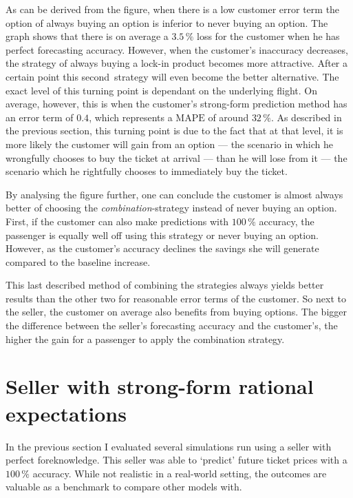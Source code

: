 As can be derived from the figure, when there is a low customer error term the option of always buying an option is inferior to never buying an option. The graph shows that there is on average a $3.5\,\%$ loss for the customer when he has perfect forecasting accuracy. However, when the customer's inaccuracy decreases, the strategy of always buying a lock-in product becomes more attractive. After a certain point this second~strategy will even become the better alternative. The exact level of this turning point is dependant on the underlying flight. On average, however, this is when the customer's strong-form prediction method has an error term of $0.4$, which represents a $\mbox{MAPE}$ of around $32\,\%$. As described in the previous section, this turning point is due to the fact that at that level, it is more likely the customer will gain from an option --- the scenario in which he wrongfully chooses to buy the ticket at arrival --- than he will lose from it --- the scenario which he rightfully chooses to immediately buy the ticket.


By analysing the figure further, one can conclude the customer is almost always better of choosing the \emph{combination}-strategy instead of never buying an option. First, if the customer can also make predictions with $100\,\%$ accuracy, the passenger is equally well off using this strategy or never buying an option. However, as the customer's accuracy declines the savings she will generate compared to the baseline increase.


This last described method of combining the strategies always yields better results than the other two for reasonable error terms of the customer. So next to the seller, the customer on average also benefits from buying options. The bigger the difference between the seller's forecasting accuracy and the customer's, the higher the gain for a passenger to apply the combination strategy.



\section{Seller with strong-form rational expectations}
\label{sec:StrongWeak}
In the previous section I evaluated several simulations run using a seller with perfect foreknowledge. This seller was able to `predict' future ticket prices with a $100\,\%$ accuracy. While not realistic in a real-world setting, the outcomes are valuable as a benchmark to compare other models with.

